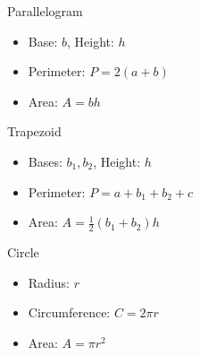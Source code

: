 \documentclass[twocolumn,a4]{article}
\begin{document}
Parallelogram \\
\begin{minipage}{0.4\linewidth}
    \begin{itemize}
        \item Base: $b$, Height: $h$
        \item Perimeter: $P = 2(a + b)$
        \item Area: $A = b h$
    \end{itemize}
\end{minipage}
\begin{minipage}{0.4\linewidth}
\end{minipage}

Trapezoid \\
\begin{minipage}{0.4\linewidth}
    \begin{itemize}
        \item Bases: $b_1, b_2$, Height: $h$
        \item Perimeter: $P = a + b_1 + b_2 + c$
        \item Area: $A = \frac{1}{2} (b_1 + b_2) h$
    \end{itemize}
\end{minipage}
\begin{minipage}{0.4\linewidth}
\end{minipage}


Circle \\
\begin{minipage}{0.4\linewidth}
	\begin{itemize}
	    \item Radius: $r$
	    \item Circumference: $C = 2\pi r$
	    \item Area: $A = \pi r^2$
	\end{itemize}
\end{minipage}
\begin{minipage}{0.4\linewidth}
\end{minipage}
\end{document}
